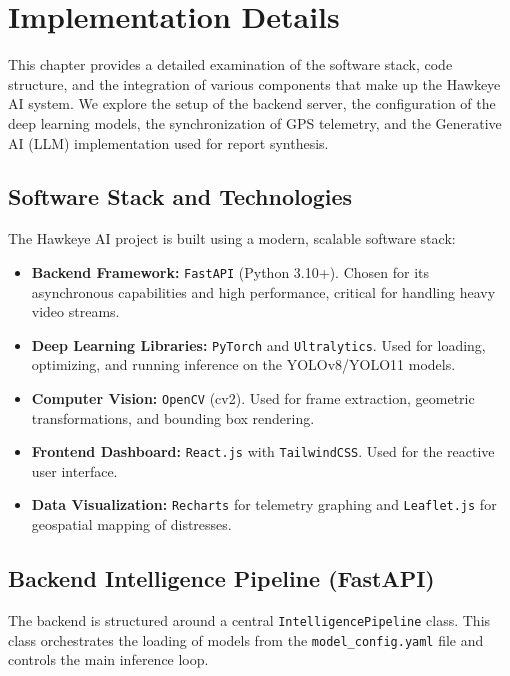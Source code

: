 \chapter{Implementation Details}
\label{chap:implementation}

This chapter provides a detailed examination of the software stack, code structure, and the integration of various components that make up the Hawkeye AI system. We explore the setup of the backend server, the configuration of the deep learning models, the synchronization of GPS telemetry, and the Generative AI (LLM) implementation used for report synthesis.

\section{Software Stack and Technologies}
The Hawkeye AI project is built using a modern, scalable software stack:
\begin{itemize}
    \item \textbf{Backend Framework:} \texttt{FastAPI} (Python 3.10+). Chosen for its asynchronous capabilities and high performance, critical for handling heavy video streams.
    \item \textbf{Deep Learning Libraries:} \texttt{PyTorch} and \texttt{Ultralytics}. Used for loading, optimizing, and running inference on the YOLOv8/YOLO11 models.
    \item \textbf{Computer Vision:} \texttt{OpenCV} (cv2). Used for frame extraction, geometric transformations, and bounding box rendering.
    \item \textbf{Frontend Dashboard:} \texttt{React.js} with \texttt{TailwindCSS}. Used for the reactive user interface.
    \item \textbf{Data Visualization:} \texttt{Recharts} for telemetry graphing and \texttt{Leaflet.js} for geospatial mapping of distresses.
\end{itemize}

\section{Backend Intelligence Pipeline (FastAPI)}
The backend is structured around a central \texttt{IntelligencePipeline} class. This class orchestrates the loading of models from the \texttt{model\_config.yaml} file and controls the main inference loop.

